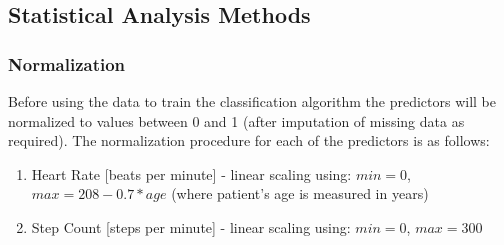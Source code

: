 \documentclass[]{article}
\begin{document}
\subsection{Statistical Analysis Methods} %

\subsubsection{Normalization}

Before using the data to train the classification algorithm the predictors will be normalized to values between 0 and 1 (after imputation of missing data as required). The normalization procedure for each of the predictors is as follows:

\begin{enumerate}
	\item Heart Rate [beats per minute] - linear scaling using: \(min = 0\), \(max = 208 - 0.7*age\) (where patient's age is measured in years) \cite{Tanaka2001}
	\item Step Count [steps per minute] - linear scaling using: \(min = 0\), \(max = 300\) 

\end{enumerate}
\end{document}
